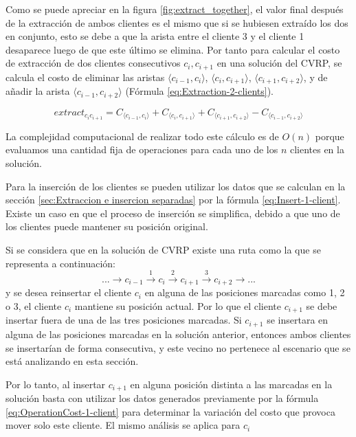 \documentclass[12pt]{report}
\begin{document}
    Como se puede apreciar en la figura \ref{fig:extract_together}, el valor final después de la extracción de ambos clientes es el mismo que si se hubiesen extraído los dos en conjunto, esto se debe a que la arista entre el cliente 3 y el cliente 1 desaparece luego de que este último se elimina. Por tanto para calcular el costo de extracción de dos clientes consecutivos $c_i,c_{i+1}$ en una solución del CVRP, se calcula el costo de eliminar las aristas $\langle c_{i-1},c_i \rangle$, $\langle c_i,c_{i+1} \rangle$, $\langle c_{i+1},c_{i+2} \rangle$, y de añadir la arista $\langle c_{i-1},c_{i+2} \rangle$ (Fórmula \ref{eq:Extraction-2-clients}).

    \begin{equation}
      	extract_{c_ic_{i+1}} = C_{\langle c_{i-1},c_i \rangle} + C_{\langle c_i,c_{i+1} \rangle} + C_{\langle c_{i+1},c_{i+2} \rangle} - C_{\langle c_{i-1},c_{i+2} \rangle}
      	\label{eq:Extraction-2-clients}
    \end{equation}

    La complejidad computacional de realizar todo este cálculo es de $O(n)$ porque evaluamos una cantidad fija de operaciones para cada uno de los $n$ clientes en la solución.

	Para la inserción de los clientes se pueden utilizar los datos que se calculan en la sección \ref{sec:Extraccion e insercion separadas} por la fórmula \ref{eq:Insert-1-client}. Existe un caso en que el proceso de inserción se simplifica, debido a que uno de los clientes puede mantener su posición original.

	Si se considera que en la solución de CVRP existe una ruta como la que se representa a continuación:
	\[
  ... \rightarrow c_{i-1} \xrightarrow{1} c_i \xrightarrow{2} c_{i+1} \xrightarrow{3} c_{i+2} \rightarrow ...
	\]
	y se desea reinsertar el cliente $c_i$ en alguna de las posiciones marcadas como 1, 2 o 3, el cliente $c_i$ mantiene su posición actual. Por lo que el cliente $c_{i+1}$ se debe insertar fuera de una de las tres posiciones marcadas. Si $c_{i+1}$ se insertara en alguna de las posiciones marcadas en la solución anterior, entonces ambos clientes se insertarían de forma consecutiva, y este vecino no pertenece al escenario que se está analizando en esta sección.

	Por lo tanto, al insertar $c_{i+1}$ en alguna posición distinta a las marcadas en la solución basta con utilizar los datos generados previamente por la fórmula \ref{eq:OperationCost-1-client} para determinar la variación del costo que provoca mover solo este cliente. El mismo análisis se aplica para $c_i$
\end{document}
